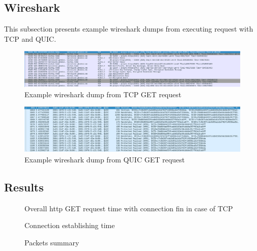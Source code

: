 \subsection{Wireshark}
\label{subsec:wireshark}
This subsection presents example wireshark dumps from executing request with TCP and QUIC.

\begin{figure}[h]
    \centering
    \includegraphics[width=\textwidth]{img/tcp-req-wireshark.png}
    \caption{Example wireshark dump from TCP GET request}
\end{figure}

\begin{figure}[h]
    \centering
    \includegraphics[width=\textwidth]{img/quic-req-wireshark.png}
    \caption{Example wireshark dump from QUIC GET request}
\end{figure}

\subsection{Results}

\begin{figure}
    \centering
    
    \caption{Overall http GET request time with connection fin in case of TCP}
    \label{fig:time}
\end{figure}

\begin{figure}
    \centering
    
    \caption{Connection establishing time}
    \label{fig:conn-est-time}
\end{figure}

\begin{figure}
    \centering
    
    \caption{Packets summary}
    \label{fig:packets-summary}
\end{figure}
